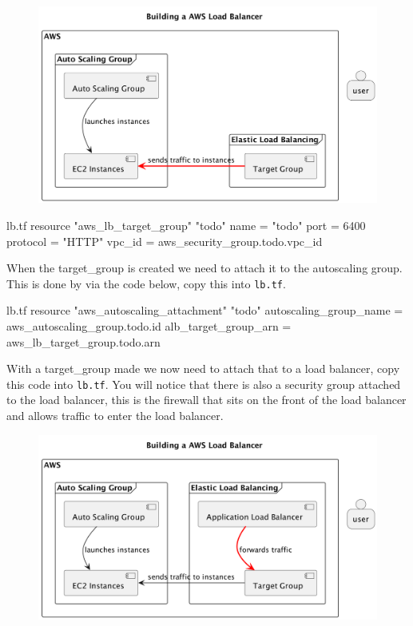 \documentclass{csse4400}
\begin{document}
\begin{figure}[H]
  \begin{center}
    \includegraphics[scale=0.2]{diagrams/lb2}
  \end{center}
\end{figure}

\begin{code}[language=terraform,numbers=none]{lb.tf}
resource "aws_lb_target_group" "todo" {
  name     = "todo"
  port     = 6400
  protocol = "HTTP"
  vpc_id   = aws_security_group.todo.vpc_id
}
\end{code}

When the target\_group is created we need to attach it to the autoscaling group. This is done by via the code below, copy this into \texttt{lb.tf}.

\begin{code}[language=terraform,numbers=none]{lb.tf}
resource "aws_autoscaling_attachment" "todo" {
  autoscaling_group_name = aws_autoscaling_group.todo.id
  alb_target_group_arn   = aws_lb_target_group.todo.arn
}
\end{code}

With a target\_group made we now need to attach that to a load balancer, copy this code into \texttt{lb.tf}. You will notice that there is also a security group attached to the load balancer, this is the firewall that sits on the front of the load balancer and allows traffic to enter the load balancer.

\begin{figure}[H]
  \begin{center}
    \includegraphics[scale=0.2]{diagrams/lb3}
  \end{center}
\end{figure}
\end{document}
